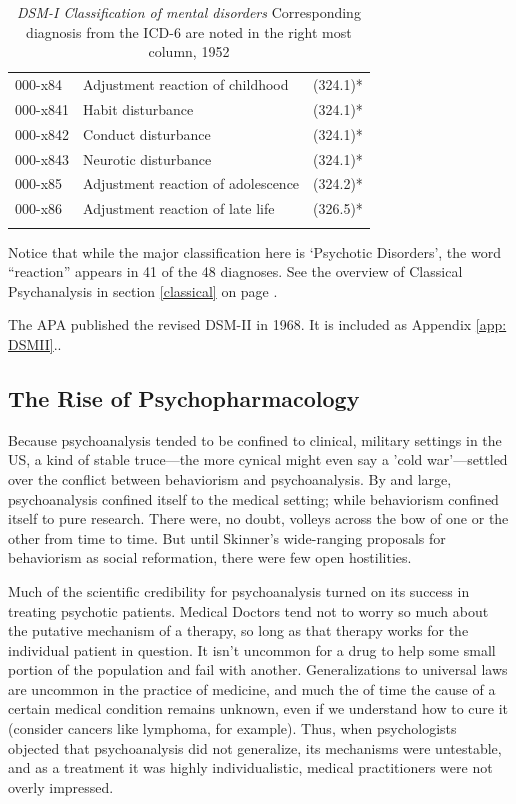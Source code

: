 \begin{refsection}
\begin{longtable}[!t]{ | p{2cm} | p{8.8cm} | p{2cm} | }
     000-x84&     Adjustment reaction of childhood&(324.1)* \\
         000-x841&          Habit disturbance&(324.1)* \\
         000-x842&          Conduct disturbance&(324.1)* \\
         000-x843&          Neurotic disturbance&(324.1)* \\
     000-x85&     Adjustment reaction of adolescence&(324.2)* \\
     000-x86&     Adjustment reaction of late life&(326.5)* \\ \hline
\caption{\emph{DSM-I Classification of mental disorders} Corresponding diagnosis from the ICD-6 are noted in the right most column, 1952}
\label{table: 1952Classification}
\end{longtable}


Notice that while the major classification here is `Psychotic Disorders', the word ``reaction'' appears in 41 of the 48 diagnoses. See the overview of Classical Psychanalysis in section \ref{classical} on page \pageref{classical}.

The APA published the revised DSM-II in 1968. It is included as Appendix \ref{app: DSMII}..

\subsection{The Rise of Psychopharmacology}
\label{theriseofpsychopharmacology}

Because psychoanalysis tended to be confined to clinical, military settings in the US, a kind of stable truce—the more cynical might even say a 'cold war’---settled over the conflict between behaviorism and psychoanalysis. By and large, psychoanalysis confined itself to the medical setting; while behaviorism confined itself to pure research. There were, no doubt, volleys across the bow of one or the other from time to time. But until Skinner's wide-ranging proposals for behaviorism as social reformation, there were few open hostilities.

Much of the scientific credibility for psychoanalysis turned on its success in treating psychotic patients. Medical Doctors tend not to worry so much about the putative mechanism of a therapy, so long as that therapy works for the individual patient in question. It isn't uncommon for a drug to help some small portion of the population and fail with another. Generalizations to universal laws are uncommon in the practice of medicine, and much the of time the cause of a certain medical condition remains unknown, even if we understand how to cure it (consider cancers like lymphoma, for example). Thus, when psychologists objected that psychoanalysis did not generalize, its mechanisms were untestable, and as a treatment it was highly individualistic, medical practitioners were not overly impressed. 


\end{refsection}
